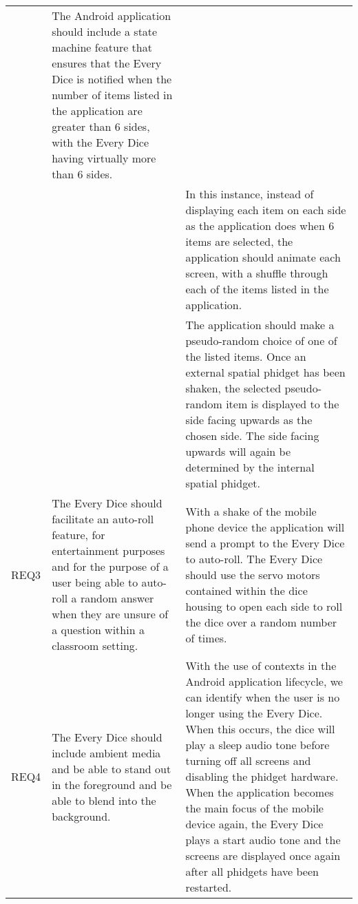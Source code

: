 \begin{xltabular}[H]{\textwidth}{c | X | X}
    &

    The Android application should include a state machine feature that ensures that the Every Dice is notified when the number of items listed in the application are greater than 6 sides, with the Every Dice having virtually more than 6 sides.\\


    &

    &

    In this instance, instead of displaying each item on each side as the application does when 6 items are selected, the application should animate each screen, with a shuffle through each of the items listed in the application.\\


    &

    &

    The application should make a pseudo-random choice of one of the listed items. Once an external spatial phidget has been shaken, the selected pseudo-random item is displayed to the side facing upwards as the chosen side. The side facing upwards will again be determined by the internal spatial phidget.\\

    \midrule

    REQ3

    &

    The Every Dice should facilitate an auto-roll feature, for entertainment purposes and for the purpose of a user being able to auto-roll a random answer when they are unsure of a question within a classroom setting.

    &

    With a shake of the mobile phone device the application will send a prompt to the Every Dice to auto-roll. The Every Dice should use the servo motors contained within the dice housing to open each side to roll the dice over a random number of times.\\

    \midrule

    REQ4

    &

    The Every Dice should include ambient media and be able to stand out in the foreground and be able to blend into the background.

    &

    With the use of contexts in the Android application lifecycle, we can identify when the user is no longer using the Every Dice. When this occurs, the dice will play a sleep audio tone before turning off all screens and disabling the phidget hardware. When the application becomes the main focus of the mobile device again, the Every Dice plays a start audio tone and the screens are displayed once again after all phidgets have been restarted.\\


\end{xltabular}
